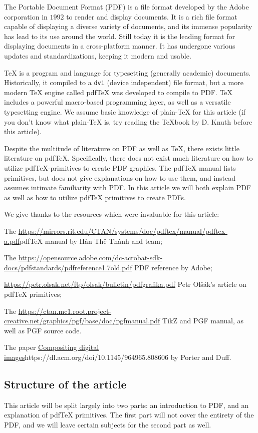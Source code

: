 The Portable Document Format (PDF) is a file format developed by the Adobe corporation in $1992$ to render and
display documents.
It is a rich file format capable of displaying a diverse variety of documents, and its immense popularity has
lead to its use around the world.
Still today it is the leading format for displaying documents in a cross-platform manner.
It has undergone various updates and standardizations, keeping it modern and usable.

\TeX{} is a program and language for typesetting (generally academic) documents.
Historically, it compiled to a {\tt dvi} (device independent) file format, but a more modern \TeX{} engine
called pdf\TeX{} was developed to compile to PDF.
\TeX{} includes a powerful macro-based programming layer, as well as a versatile typesetting engine.
We assume basic knowledge of plain-\TeX{} for this article (if you don't know what plain-\TeX{} is, try reading
the \TeX book by D. Knuth before this article).

Despite the multitude of literature on PDF as well as \TeX, there exists little literature on pdf\TeX.
Specifically, there does not exist much literature on how to utilize pdf\TeX-primitives to create PDF graphics.
The pdf\TeX{} manual lists primitives, but does not give explanations on how to use them, and instead assumes
intimate familiarity with PDF.
In this article we will both explain PDF as well as how to utilize pdf\TeX{} primitives to create PDFs.

We give thanks to the resources which were invaluable for this article:
\blist
    \item The \url{https://mirrors.rit.edu/CTAN/systems/doc/pdftex/manual/pdftex-a.pdf}{pdf\TeX{} manual} by
    H\`an Th\^e\llap{\raise 0.5ex\hbox{\'{}}} Th\`anh and team;
    \item The \url{https://opensource.adobe.com/dc-acrobat-sdk-docs/pdfstandards/pdfreference1.7old.pdf}
    {PDF reference} by Adobe;
    \item \url{https://petr.olsak.net/ftp/olsak/bulletin/pdfgrafika.pdf}
    {Petr Ol\v s\'ak's article on pdf\TeX{} primitives};
    \item The \url{https://ctan.mc1.root.project-creative.net/graphics/pgf/base/doc/pgfmanual.pdf}
    {TikZ and PGF manual}, as well as PGF source code.
    \item The paper \url{Compositing digital images}{https://dl.acm.org/doi/10.1145/964965.808606}
        by Porter and Duff.
\elist

\subsection*{Structure of the article}

This article will be split largely into two parts: an introduction to PDF, and an explanation of pdf\TeX{}
primitives.
The first part will not cover the entirety of the PDF, and we will leave certain subjects for the second part
as well.

